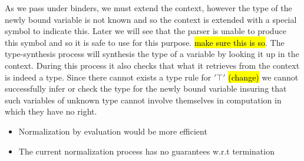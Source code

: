 As we pass under binders, we must extend the context, however the type of
the newly bound variable is not known and so the context is extended with
a special symbol to indicate this. Later we will see that the parser is
unable to produce this symbol and so it is safe to use for this purpose.
\hl{make sure this is so}. The type-synthesis process will synthesis the
type of a variable by looking it up in the context. During this process
it also checks that what it retrieves from the context is indeed a type.
Since there cannot exists a type rule for $'⊤'$ \hl{(change)} we cannot
successfully infer or check the type for the newly bound variable insuring
that such variables of unknown type cannot involve themselves in
computation in which they have no right.

\begin{itemize}
  \item Normalization by evaluation would be more efficient
  \item The current normalization process has no guarantees w.r.t
        termination
\end{itemize}

